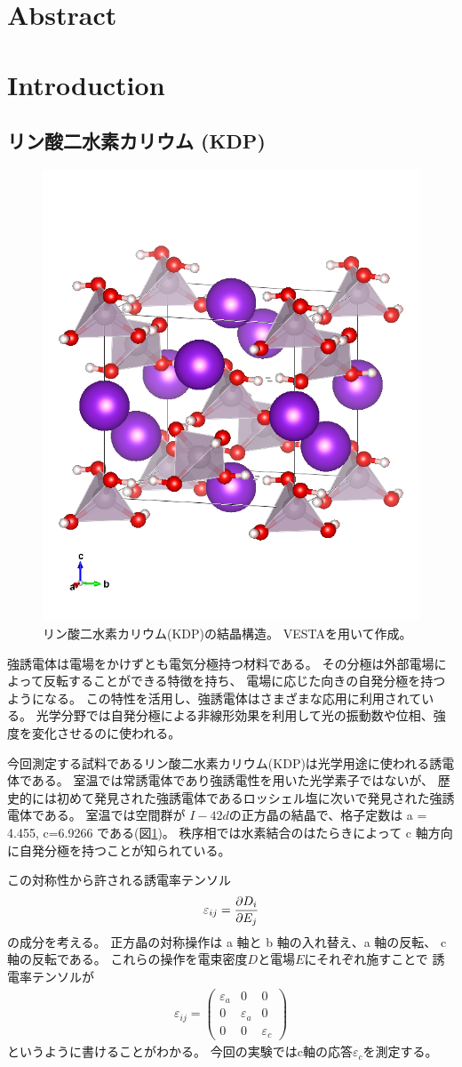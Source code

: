 \documentclass[9pt,dvipdfmx,a4paper]{jsarticle}
\begin{document}

\section{Abstract}

\section{Introduction}
\subsection*{リン酸二水素カリウム (KDP)}
\begin{figure}
    \centering
    \includegraphics[width = 0.3\columnwidth]{KDP_tetragonal.png}
    \caption{\small{リン酸二水素カリウム(KDP)の結晶構造\cite{cif:7020834}。
    VESTAを用いて作成\cite{VESTA}。}}
    \label{fig:KDP_lattice}
\end{figure}
強誘電体は電場をかけずとも電気分極持つ材料である。
その分極は外部電場によって反転することができる特徴を持ち、
電場に応じた向きの自発分極を持つようになる。
この特性を活用し、強誘電体はさまざまな応用に利用されている。
光学分野では自発分極による非線形効果を利用して光の振動数や位相、強度を変化させるのに使われる。

今回測定する試料であるリン酸二水素カリウム(KDP)は光学用途に使われる誘電体である。
室温では常誘電体であり強誘電性を用いた光学素子ではないが、
歴史的には初めて発見された強誘電体であるロッシェル塩に次いで発見された強誘電体である。
室温では空間群が \(I-4 2 d\)の正方晶の結晶で、格子定数は a = 4.455, c=6.9266 である(図\ref{fig:KDP_lattice})。
秩序相では水素結合のはたらきによって c 軸方向に自発分極を持つことが知られている\cite{onodera}。

この対称性から許される誘電率テンソル
\begin{align}
    \varepsilon_{ij}=\pdv{D_i}{E_j}
\end{align}
の成分を考える。
正方晶の対称操作は a 軸と b 軸の入れ替え、a 軸の反転、 c 軸の反転である。
これらの操作を電束密度\(D\)と電場\(E\)にそれぞれ施すことで
誘電率テンソルが
\begin{align}
    \varepsilon_{ij}=
    \begin{pmatrix}
        \varepsilon_a & 0 & 0\\
        0 & \varepsilon_a & 0\\
        0 & 0 & \varepsilon_c
    \end{pmatrix}
\end{align}
というように書けることがわかる。
今回の実験ではc軸の応答\(\varepsilon_c\)を測定する。
\end{document}
